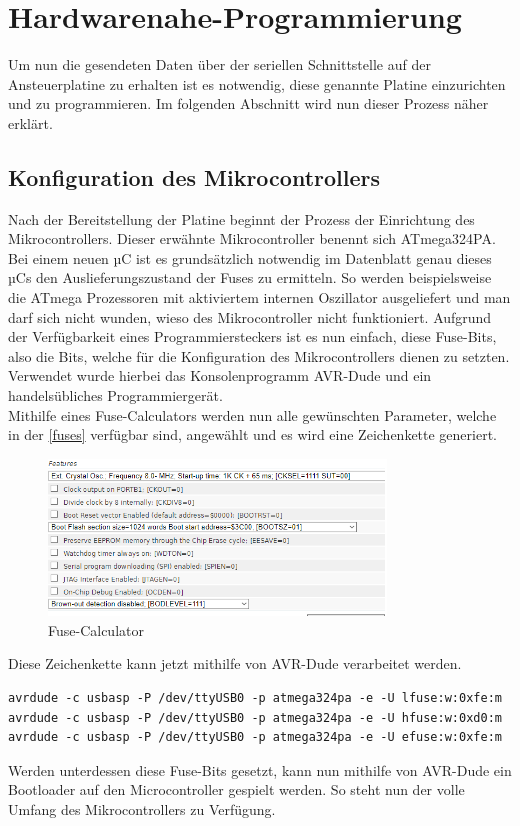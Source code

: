 \section{Hardwarenahe-Programmierung}
Um nun die gesendeten Daten über der seriellen Schnittstelle auf der Ansteuerplatine zu erhalten ist es notwendig, diese genannte Platine einzurichten und zu programmieren.
Im folgenden Abschnitt wird nun dieser Prozess näher erklärt.
\subsection{Konfiguration des Mikrocontrollers}
Nach der Bereitstellung der Platine beginnt der Prozess der Einrichtung des Mikrocontrollers.
Dieser erwähnte Mikrocontroller benennt sich ATmega324PA.\\
Bei einem neuen µC ist es grundsätzlich notwendig im Datenblatt genau dieses µCs den Auslieferungszustand der Fuses zu ermitteln.
So werden beispielsweise die ATmega Prozessoren mit aktiviertem internen Oszillator ausgeliefert und man darf sich nicht wunden, wieso des Mikrocontroller nicht funktioniert.
Aufgrund der Verfügbarkeit eines Programmiersteckers ist es nun einfach, diese Fuse-Bits, also die Bits, welche für die Konfiguration des Mikrocontrollers dienen zu setzten.
Verwendet wurde hierbei das Konsolenprogramm AVR-Dude und ein handelsübliches Programmiergerät.\\
Mithilfe eines Fuse-Calculators werden nun alle gewünschten Parameter, welche in der \autoref{fuses} verfügbar sind, angewählt und es wird eine Zeichenkette generiert.
\begin{figure}[H]
\centering
\includegraphics[width=0.8\textwidth]{fig/ainf/Features.PNG}
\caption{Fuse-Calculator}
\label{fuses}
\end{figure}
Diese Zeichenkette kann jetzt mithilfe von AVR-Dude verarbeitet werden.
\begin{lstlisting}[style=java,caption=Java-Codebeispiel,label=resource]
avrdude -c usbasp -P /dev/ttyUSB0 -p atmega324pa -e -U lfuse:w:0xfe:m
avrdude -c usbasp -P /dev/ttyUSB0 -p atmega324pa -e -U hfuse:w:0xd0:m
avrdude -c usbasp -P /dev/ttyUSB0 -p atmega324pa -e -U efuse:w:0xfe:m
\end{lstlisting}
Werden unterdessen diese Fuse-Bits gesetzt, kann nun mithilfe von AVR-Dude ein Bootloader auf den Microcontroller gespielt werden.
So steht nun der volle Umfang des Mikrocontrollers zu Verfügung.\\\\
